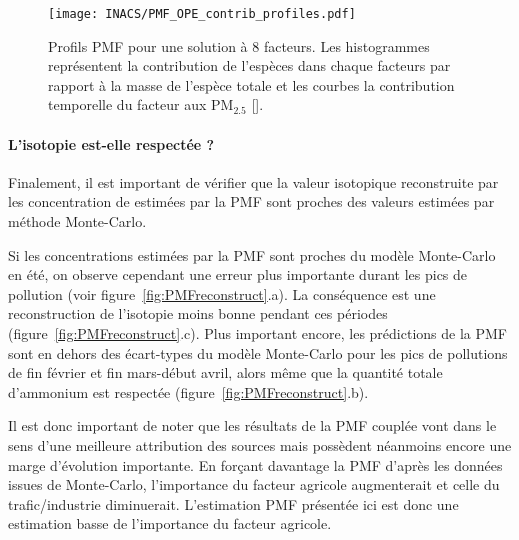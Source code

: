 \begin{figure}[ht]
    \centering
    \texttt{[image: INACS/PMF\_OPE\_contrib\_profiles.pdf]}
    \caption{
        Profils PMF pour une solution à 8 facteurs. Les histogrammes représentent la
        contribution de l'espèces dans chaque facteurs par rapport à la masse de l'espèce
        totale et les courbes la contribution temporelle du facteur aux PM$_{2.5}$ [\si{\ugm}].
    }
    \label{fig:PMF}
\end{figure}

\paragraph{L'isotopie est-elle respectée ?}%
\label{par:l_isotopie_est_elle_respectée_}

Finalement, il est important de vérifier que la valeur isotopique reconstruite par les
concentration de \NHq{} estimées par la PMF sont proches des valeurs estimées par méthode
Monte-Carlo.

Si les concentrations estimées par la PMF sont proches du modèle Monte-Carlo en été, on
observe cependant une erreur plus importante durant les pics de pollution (voir
figure~\ref{fig:PMFreconstruct}.a).
La conséquence est une reconstruction de l'isotopie moins bonne pendant ces périodes
(figure~\ref{fig:PMFreconstruct}.c).
Plus important encore, les prédictions de la PMF sont en dehors des écart-types du modèle
Monte-Carlo pour les pics de pollutions de fin février et fin mars-début avril, alors même
que la quantité totale d'ammonium est respectée (figure~\ref{fig:PMFreconstruct}.b).

Il est donc important de noter que les résultats de la PMF couplée vont dans le sens d'une
meilleure attribution des sources mais possèdent néanmoins encore une marge d'évolution
importante.
En \og forçant \fg{} davantage la PMF d'après les données issues de Monte-Carlo,
l'importance du facteur agricole augmenterait et celle du trafic/industrie diminuerait.
L'estimation PMF présentée ici est donc une estimation basse de l'importance du facteur
agricole.

